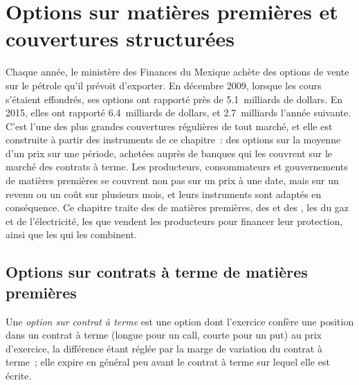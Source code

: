 \chapter{Options sur matières premières et couvertures structurées}\label{ch:m3:commodity-options-and-structured-hedges}

Chaque année, le ministère des Finances du Mexique achète des options de vente sur le pétrole qu'il prévoit d'exporter. En
décembre 2009, lorsque les cours s'étaient effondrés, ses options ont rapporté près de 5.1~milliards de dollars. En 2015, elles ont rapporté 6.4~milliards de dollars, et 2.7~milliards
l'année suivante. C'est l'une des plus grandes couvertures régulières de tout marché, et elle est construite
à partir des instruments de ce chapitre~: des options sur la moyenne d'un prix sur une période, achetées auprès
de banques qui les couvrent sur le marché des contrats à terme. Les producteurs, consommateurs et gouvernements de matières premières
se couvrent non pas sur un prix à une date, mais sur un revenu ou un coût sur plusieurs mois, et leurs instruments sont
adaptés en conséquence. Ce chapitre traite des  de matières premières, des  et
des , les  du gaz et de l'électricité, les  que vendent les producteurs
pour financer leur protection, ainsi que les  qui les combinent.

\section{Options sur contrats à terme de matières premières}

\begin{definition}\label{def:m3:commodity-options-and-structured-hedges:fo}
Une \emph{option sur contrat à terme} est une option dont l'exercice confère une position dans un
contrat à terme (longue pour un call, courte pour un put) au prix d'exercice, la différence étant réglée
par la marge de variation du contrat à terme~; elle expire en général peu avant le contrat à terme sur lequel elle est écrite.
\end{definition}


